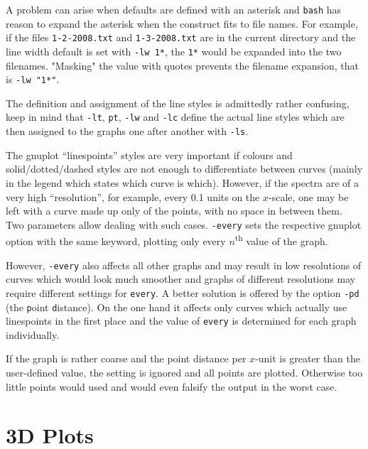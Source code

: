 \documentclass[12pt, a4paper]{article}
\begin{document}
A problem can arise when defaults are defined with an asterisk and \verb'bash' has reason to expand the asterisk when the construct fits to file names. For example, if the files \verb'1-2-2008.txt' and \verb'1-3-2008.txt' are in the current directory and the line width default is set with \verb'-lw 1*', the \verb'1*' would be expanded into the two filenames. "Masking" the value with quotes prevents the filename expansion, that is \verb'-lw "1*"'.

The definition and assignment of the line styles is admittedly rather confusing, keep in mind that \verb'-lt', \verb'pt', \verb'-lw' and \verb'-lc' define the actual line styles which are then assigned to the graphs one after another with \verb'-ls'.

The gnuplot ``linespoints'' styles are very important if colours and solid/dotted/dashed styles are not enough to differentiate between curves (mainly in the legend which states which curve is which). However, if the spectra are of a very high ``resolution'', for example, every 0.1 units on the $x$-scale, one may be left with a curve made up only of the points, with no space in between them. Two parameters allow dealing with such cases. \verb'-every' sets the respective gnuplot option with the same keyword, plotting only every $n$\textsuperscript{th} value of the graph.

However, \verb'-every' also affects all other graphs and may result in low resolutions of curves which would look much smoother and graphs of different resolutions may require different settings for \verb'every'. A better solution is offered by the option \verb'-pd' (the \verb'p'oint \verb'd'istance). On the one hand it affects only curves which actually use linespoints in the first place and the value of \verb'every' is determined for each graph individually.

If the graph is rather coarse and the point distance per $x$-unit is greater than the user-defined value, the setting is ignored and all points are plotted. Otherwise too little points would used and would even falsify the output in the worst case. 



\newpage

\section{3D Plots}
\end{document}
